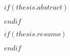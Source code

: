 $if(thesis.abstract)$
\begingroup
\renewcommand{\abovechapterskip}{\vspace*{10pt}}  %
  \renewcommand{\chapterbelowskip}{\vspace*{10pt}}  %
  \renewcommand{\chapteralign}{\centering}      %
  \renewcommand{\chapterfont}{\bfseries\Large}  %
\begin{abstract}
 
\end{abstract}
\newpage %
\endgroup
$endif$

$if(thesis.resumo)$
\begingroup
 \renewcommand{\abovechapterskip}{\vspace*{10pt}}  %
  \renewcommand{\chapterbelowskip}{\vspace*{10pt}}  %
  \renewcommand{\chapteralign}{\centering}      %
  \renewcommand{\chapterfont}{\bfseries\Large}  %
\begin{resumo}
 
\end{resumo}
\newpage %
\endgroup
$endif$



\begingroup
\hypersetup{linkcolor=$if(toclinkcolor)$$toclinkcolor$$else$black$endif$}


	\renewcommand{\chapteralign}{\centering}
	\renewcommand{\chapterfont}{\bfseries\Large}

